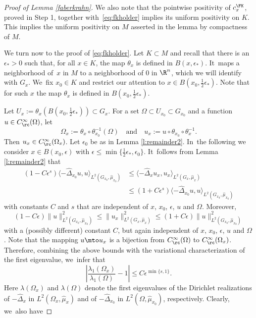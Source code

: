 \begin{proof}[Proof of Lemma \ref{faberkrahn}]
We also note that the pointwise positivity of $c^\FK_x$, proved in Step 1, together with~\eqref{eq:fkholder} implies its uniform positivity on $K$. This implies the uniform positivity on $M$ asserted in the lemma by compactness of $M$.

We turn now to the proof of \eqref{eq:fkholder}. Let $K\subset M$ and recall that there is an $\epsilon_*>0$ such that, for all $x\in K$, the map $\theta_x$ is defined in $B(x,\epsilon_*)$. It~maps a neighborhood of~$x$ in $M$ to a neighborhood of $0$ in $\R^n$, which we will identify with $G_x$. We~fix $x_0\in K$ and restrict our attention to $x\in B(x_0,\frac12\epsilon_*)$. Note that for such $x$ the map $\theta_x$ is defined in $B(x_0,\frac12\epsilon_*)$.

Let $U_x :=\theta_{x}(B(x_0,\frac12\epsilon_*))\subset G_x$. For a set $\Omega\subset U_{x_0}\subset G_{x_0}$ and a function $u\in C^\infty_\rc(\Omega)$, let
\[
\Omega_x:= \theta_x\circ \theta_{x_0}^{-1}(\Omega)
\quad\text{and}\quad
u_x := u \circ \theta_{x_0} \circ \theta_x^{-1}.
\]
Then $u_x\in C^\infty_\rc(\Omega_x)$. Let $\epsilon_0$ be as in Lemma \ref{l:remainder2}. In~the following we consider $x\in B(x_0,\epsilon)$ with $\epsilon\leq\min\{\frac12\epsilon_*,\epsilon_0\}$. It~follows from Lemma \ref{l:remainder2} that
\begin{align*}
(1-C \epsilon^s) \langle -\widehat\Delta_{x_0} u, u \rangle_{L^2(G_{x_0},\widehat\mu_{x_0})} & \leq
\langle -\widehat\Delta_{x} u_x, u_x \rangle_{L^2(G_{x},\widehat\mu_{x})} \\
& \leq (1+C \epsilon^s) \langle -\widehat\Delta_{x_0} u, u \rangle_{L^2(G_{x_0},\widehat\mu_{x_0})}
\end{align*}
with constants $C$ and $s$ that are independent of $x$, $x_0$, $\epsilon$, $u$ and $\Omega$. Moreover,
\[
(1-C \epsilon) \| u \|_{L^2(G_{x_0},\widehat\mu_{x_0})}^2 \leq
\| u_x \|_{L^2(G_{x},\widehat\mu_{x})}^2
\leq (1+C \epsilon) \| u \|_{L^2(G_{x_0},\widehat\mu_{x_0})}^2
\]
with a (possibly different) constant $C$, but again independent of $x$, $x_0$, $\epsilon$, $u$ and $\Omega$. Note that the mapping $u\mto u_x$ is a bijection from $C^\infty_\rc(\Omega)$ to $C^\infty_\rc(\Omega_x)$. Therefore, combining the above bounds with the variational characterization of the first eigenvalue, we~infer that
\begin{equation}
\label{eq:fkcontproof1}
\left| \frac{\lambda_1(\Omega_x)}{\lambda_1(\Omega)} - 1\right| \leq C \epsilon^{\min\{s,1\}}.
\end{equation}
Here $\lambda(\Omega_x)$ and $\lambda(\Omega)$ denote the first eigenvalues of the Dirichlet realizations of $-\widehat\Delta_x$ in $L^2(\Omega_x,\widehat\mu_x)$ and of $-\widehat\Delta_{x_0}$ in $L^2(\Omega,\widehat\mu_{x_0})$, respectively. Clearly, we~also have

\end{proof}
